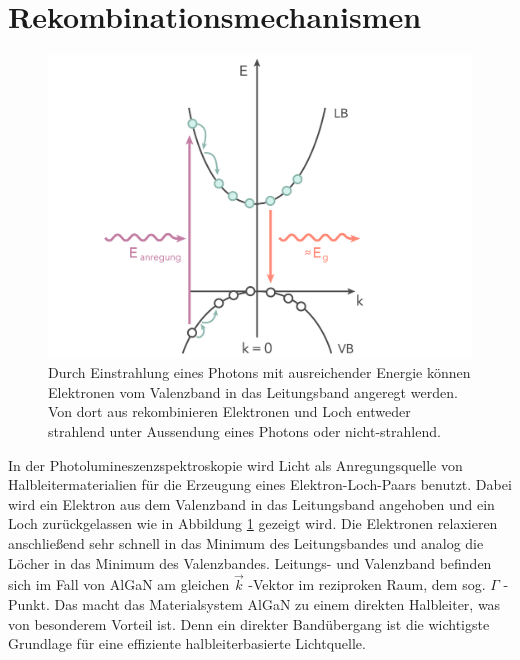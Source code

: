 
\thispagestyle{fancy}


\section{Rekombinationsmechanismen}
%
\begin{figure}[h]
\centering
\begin{minipage}[t]{1\linewidth}
\centering
\includegraphics[width=0.8\linewidth]{Bilder/bandrekomb.png}
\end{minipage}%
\caption{Durch Einstrahlung eines Photons mit ausreichender Energie können Elektronen vom Valenzband in das Leitungsband angeregt werden. Von dort aus rekombinieren Elektronen und Loch entweder strahlend unter Aussendung eines Photons oder nicht-strahlend.}
 \label{fig:bandrekomb}
\end{figure}
\noindent
In der Photolumineszenzspektroskopie wird Licht als Anregungsquelle von Halbleitermaterialien für die Erzeugung eines Elektron-Loch-Paars benutzt. Dabei wird ein Elektron aus dem Valenzband in das Leitungsband angehoben und ein Loch zurückgelassen wie in Abbildung \ref{fig:bandrekomb} gezeigt wird. Die Elektronen relaxieren anschließend sehr schnell in das Minimum des Leitungsbandes und analog die Löcher in das Minimum des Valenzbandes. 
Leitungs- und Valenzband befinden sich im Fall von AlGaN am gleichen $\vec{k}$ -Vektor im reziproken Raum, dem sog. $\Gamma$ -Punkt. Das macht das Materialsystem AlGaN zu einem direkten Halbleiter, was von besonderem Vorteil ist. Denn ein direkter Bandübergang ist die wichtigste Grundlage für eine effiziente halbleiterbasierte Lichtquelle. 
